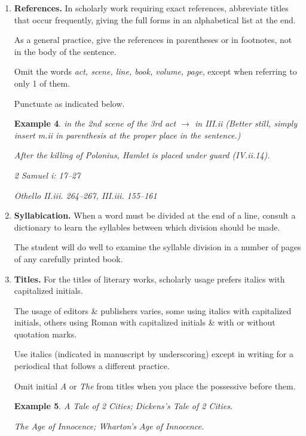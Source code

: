 \documentclass{article}
\newtheorem{example}{Example}
\begin{document}
\begin{enumerate}
\begin{example}
		Bliss was it in that dawn to be alive,
		
		But to be young was very heaven!
	\end{example}
	Quotations introduced by {\it that} are indirect discourse \& not enclosed in quotation marks.
	\begin{example}
		Keats declares that beauty is truth, truth beauty.
		
		Dickinson states that a coffin is a small domain.
	\end{example}
	Proverbial expressions \& familiar phrases of literary origin require no quotation marks.
	\begin{example}
		These are the times that try men's souls.
		
		He lives far from the madding crowd.
	\end{example}
	\item {\bf References.} In scholarly work requiring exact references, abbreviate titles that occur frequently, giving the full forms in an alphabetical list at the end.
	
	As a general practice, give the references in parentheses or in footnotes, not in the body of the sentence.
	
	Omit the words {\it act, scene, line, book, volume, page}, except when referring to only 1 of them.
	
	Punctuate as indicated below.
	\begin{example}
		in the 2nd scene of the 3rd act $\to$ in III.ii (Better still, simply insert m.ii in parenthesis at the proper place in the sentence.)
		
		After the killing of Polonius, Hamlet is placed under guard (IV.ii.14).
		
		2 Samuel i: 17--27
		
		Othello II.iii. 264--267, III.iii. 155--161
	\end{example}
	\item {\bf Syllabication.} When a word must be divided at the end of a line, consult a dictionary to learn the syllables between which division should be made.
	
	The student will do well to examine the syllable division in a number of pages of any carefully printed book.
	\item {\bf Titles.} For the titles of literary works, scholarly usage prefers italics with capitalized initials.
	
	The usage of editors \& publishers varies, some using italics with capitalized initials, others using Roman with capitalized initials \& with or without quotation marks.
	
	Use italics (indicated in manuscript by underscoring) except in writing for a periodical that follows a different practice.
	
	Omit initial {\it A} or {\it The} from titles when you place the possessive before them.
	\begin{example}
		\emph{A} Tale of 2 Cities; \emph{Dickens's} Tale of 2 Cities.
		
		The Age of Innocence; \emph{Wharton's} Age of Innocence.
	\end{example}
\end{enumerate}
\end{document}
